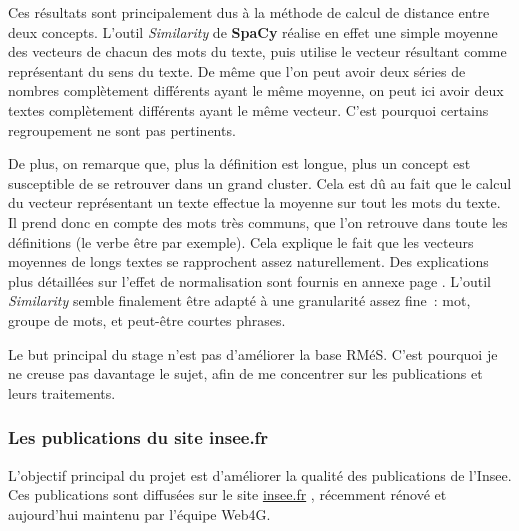 
Ces résultats sont principalement dus à la méthode de calcul de distance entre deux concepts. L'outil \textit{Similarity} de \textbf{SpaCy} réalise en effet une simple moyenne des vecteurs de chacun des mots du texte, puis utilise le vecteur résultant comme représentant du sens du texte. De même que l'on peut avoir deux séries de nombres complètement différents ayant le même moyenne, on peut ici avoir deux textes complètement différents ayant le même vecteur. C'est pourquoi certains regroupement ne sont pas pertinents.

De plus, on remarque que, plus la définition est longue, plus un concept est susceptible de se retrouver dans un grand cluster. Cela est dû au fait que le calcul du vecteur représentant un texte effectue la moyenne sur tout les mots du texte. Il prend donc en compte des mots très communs, que l'on retrouve dans toute les définitions (le verbe être par exemple). Cela explique le fait que les vecteurs moyennes de longs textes se rapprochent assez naturellement. Des explications plus détaillées sur l'effet de normalisation sont fournis en annexe page \pageref{hierarchisation}. L'outil \textit{Similarity} semble finalement être adapté à une granularité assez fine~: mot, groupe de mots, et peut-être courtes phrases.
\newline

Le but principal du stage n'est pas d'améliorer la base RMéS. C'est pourquoi je ne creuse pas davantage le sujet, afin de me concentrer sur les publications et leurs traitements.
\label{section 1.2.1 - Premières tentatives}

\subsubsection{Les publications du site insee.fr}

L'objectif principal du projet est d'améliorer la qualité des publications de l'Insee. Ces publications sont diffusées sur le site \href{https://insee.fr/fr/accueil}{insee.fr} \cite{insee.fr}, récemment rénové et aujourd'hui maintenu par l'équipe Web4G.
\newline

